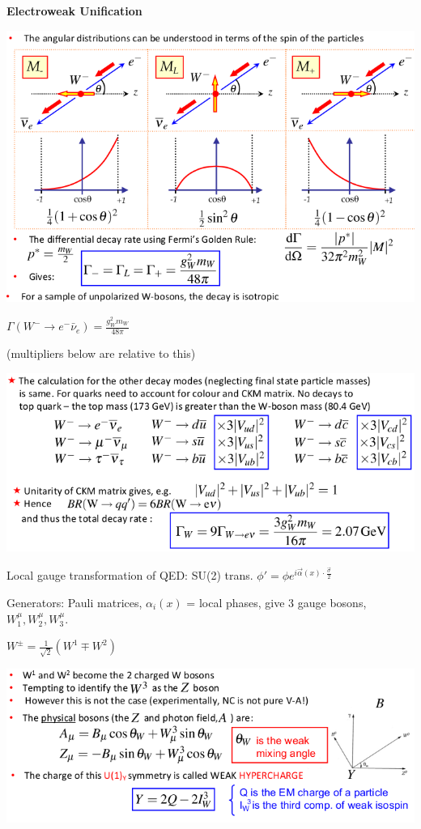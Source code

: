 \textbf{Electroweak Unification}


\begin{center}
    \includegraphics[width=\linewidth]{images/w_decays.png}

    $\Gamma(W^- \to e^- \bar{\nu}_e) = \frac{g_W^2 m_W}{48\pi}$

    (multipliers below are relative to this)

    \includegraphics[width=\linewidth]{images/w_quark_decays.png}
\end{center}
Local gauge transformation of QED: SU(2) trans. $\phi' = \phi e^{i\vec{\alpha}(x) \cdot \frac{\vec{\sigma}}{2}}$

Generators: Pauli matrices, $\alpha_i(x)$ = local phases, give 3 gauge bosons, $W_1^\mu, W_2^\mu, W_3^\mu$.

$W^\pm = \frac{1}{\sqrt{2}} \left(W^1 \mp W^2\right)$

\begin{center}
    \includegraphics[width=\linewidth]{images/ew_unification.png}
\end{center}

